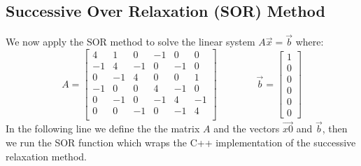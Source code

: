 \documentclass[11pt]{article}
\begin{document}
    \subsection{Successive Over Relaxation (SOR)
Method}\label{successive-over-relaxation-sor-method}

We now apply the SOR method to solve the linear system
\(A\vec{x}=\vec{b}\) where: \[A=\begin{bmatrix}4 & 1 & 0 & -1 & 0 & 0\\
-1& 4 & -1 & 0 & -1 & 0\\
0 & -1 & 4 & 0 & 0 & 1\\
-1 & 0 & 0 & 4 & -1 & 0\\
0 & -1 & 0 & -1 & 4& -1\\
0 & 0 & -1 & 0 & -1 & 4\\
\end{bmatrix}\qquad\qquad \vec{b}=\begin{bmatrix}1\\0\\0\\0\\0\\0\end{bmatrix}\]
In the following line we define the the matrix \(A\) and the vectors
\(\vec{x0}\) and \(\vec{b}\), then we run the SOR function which wraps
the C++ implementation of the successive relaxation method.
\end{document}
